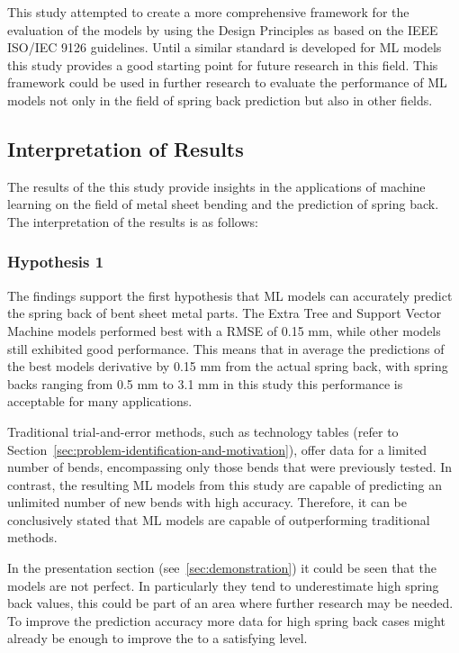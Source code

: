This study attempted to create a more comprehensive framework for the evaluation of the models by using the Design
Principles as based on the IEEE ISO/IEC 9126 guidelines.
Until a similar standard is developed for \ac{ML} models this study provides a good starting point for future research
in this field.
This framework could be used in further research to evaluate the performance of \ac{ML} models not only in the field of
spring back prediction but also in other fields.

\subsection{Interpretation of Results}\label{subsec:interpretation-of-results}

The results of the this study provide insights in the applications of machine learning on the field of metal sheet
bending and the prediction of spring back.
The interpretation of the results is as follows:

\subsubsection{Hypothesis 1}
The findings support the first hypothesis that \ac{ML} models can accurately predict the spring back of bent sheet
metal parts.
The Extra Tree and Support Vector Machine models performed best with a RMSE of 0.15 mm, while other models still
exhibited good performance.
This means that in average the predictions of the best models derivative by 0.15 mm from the actual spring back,
with spring backs ranging from 0.5 mm to 3.1 mm in this study this performance is acceptable for many applications.

Traditional trial-and-error methods, such as technology tables (refer to
Section~\ref{sec:problem-identification-and-motivation}), offer data for a limited number of bends, encompassing
only those bends that were previously tested.
In contrast, the resulting \ac{ML} models from this study are capable of predicting an unlimited number of new bends
with high accuracy.
Therefore, it can be conclusively stated that \ac{ML} models are capable of outperforming traditional methods.

In the presentation section (see~\ref{sec:demonstration}) it could be seen that the models are not perfect.
In particularly they tend to underestimate high spring back values, this could be part of an area where further research
may be needed.
To improve the prediction accuracy more data for high spring back cases might already be enough to improve the to a
satisfying level.

